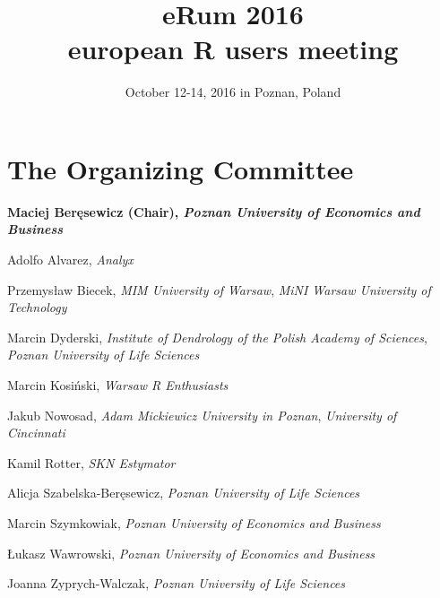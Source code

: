 \documentclass[11pt,oneside]{book}
\title{eRum 2016 \\ european R users meeting}
\author{October 12-14, 2016 in Poznan, Poland}
\date{}
\begin{document}


\frontmatter
\maketitle

\chapter{The Organizing Committee}

\textbf{Maciej Beręsewicz (Chair), \textit{Poznan University of Economics and Business}}

Adolfo Alvarez, \textit{Analyx}

Przemysław Biecek, \textit{MIM University of Warsaw}, \textit{MiNI Warsaw University of Technology}

Marcin Dyderski, \textit{Institute of Dendrology of the Polish Academy of Sciences}, \textit{Poznan University of Life Sciences}

Marcin Kosiński, \textit{Warsaw R Enthusiasts}

Jakub Nowosad, \textit{Adam Mickiewicz University in Poznan}, \textit{University of Cincinnati}

Kamil Rotter, \textit{SKN Estymator}

Alicja Szabelska-Beręsewicz, \textit{Poznan University of Life Sciences}

Marcin Szymkowiak, \textit{Poznan University of Economics and Business}

Łukasz Wawrowski, \textit{Poznan University of Economics and Business}

Joanna Zyprych-Walczak, \textit{Poznan University of Life Sciences}
\end{document}
